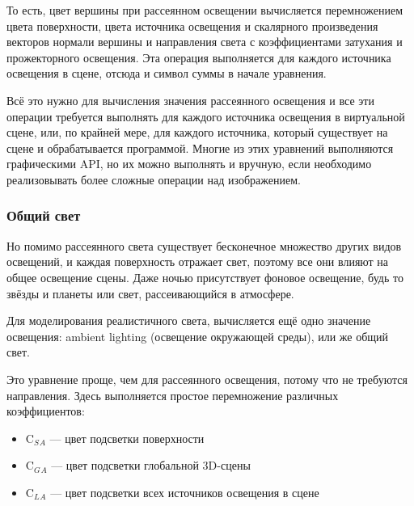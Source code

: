 \begin{figure}[H]
\end{figure}

То есть, цвет вершины при рассеянном освещении вычисляется перемножением цвета поверхности, цвета источника освещения и скалярного произведения векторов нормали вершины и направления света с коэффициентами затухания и прожекторного освещения. Эта операция выполняется для каждого источника освещения в сцене, отсюда и символ суммы в начале уравнения.

Всё это нужно для вычисления значения рассеянного освещения и все эти операции требуется выполнять для каждого источника освещения в виртуальной сцене, или, по крайней мере, для каждого источника, который существует на сцене и обрабатывается программой. Многие из этих уравнений выполняются графическими API, но их можно выполнять и вручную, если необходимо реализовывать более сложные операции над изображением.

\subsubsection{Общий свет}

Но помимо рассеянного света существует бесконечное множество других видов освещений, и каждая поверхность отражает свет, поэтому все они влияют на общее освещение сцены. Даже ночью присутствует фоновое освещение, будь то звёзды и планеты или свет, рассеивающийся в атмосфере.

Для моделирования реалистичного света, вычисляется ещё одно значение освещения: ambient lighting (освещение окружающей среды), или же общий свет.

\begin{figure}[H]
\end{figure}

Это уравнение проще, чем для рассеянного освещения, потому что не требуются направления. Здесь выполняется простое перемножение различных коэффициентов:

\begin{itemize}
	\item C$_S$$_A$ — цвет подсветки поверхности
	\item C$_G$$_A$ — цвет подсветки глобальной 3D-сцены
	\item C$_L$$_A$ — цвет подсветки всех источников освещения в сцене
\end{itemize}

